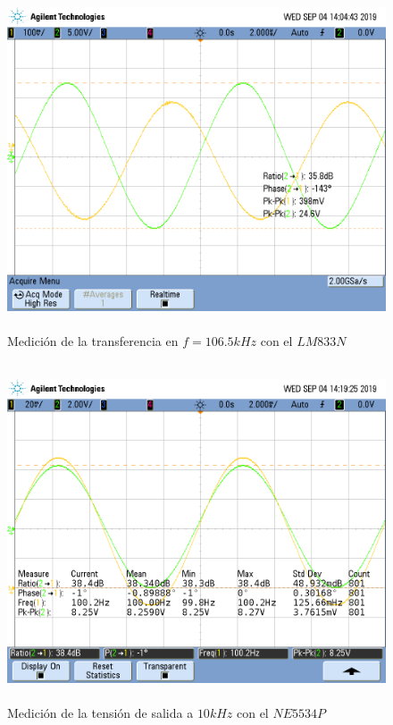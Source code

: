 \begin{figure}
\begin{center}
\includegraphics[height=10cm]{../Ex2/Informe/rsc/lm_1.png}
\caption{Medición de la transferencia en $f=106.5 kHz$ con el $LM833N$}
\label{fig:e2_lm_fB}
\end{center}
\end{figure}

\begin{figure}
\begin{center}
\includegraphics[height=10cm]{../Ex2/Informe/rsc/ne_0.png}
\caption{Medición de la tensión de salida a $10 kHz$ con el $NE5534P$}
\label{fig:e2_ne_10k}
\end{center}
\end{figure}

